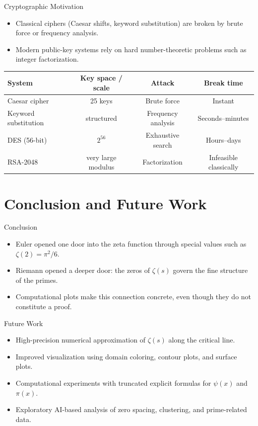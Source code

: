 \documentclass[aspectratio=43]{beamer}
\begin{document}
\begin{frame}{Cryptographic Motivation}
\begin{itemize}
    \item Classical ciphers (Caesar shifts, keyword substitution) are broken by brute force or frequency analysis.
    \item Modern public-key systems rely on hard number-theoretic problems such as integer factorization.
\end{itemize}

\vspace{0.6em}
\centering
\begin{tabular}{lccc}
\toprule
System & Key space / scale & Attack & Break time \\
\midrule
Caesar cipher & 25 keys & Brute force & Instant \\
Keyword substitution & structured & Frequency analysis & Seconds--minutes \\
DES (56-bit) & $2^{56}$ & Exhaustive search & Hours--days \\
RSA-2048 & very large modulus & Factorization & Infeasible classically \\
\bottomrule
\end{tabular}
\end{frame}

\section{Conclusion and Future Work}

\begin{frame}{Conclusion}
\begin{itemize}
    \item Euler opened one door into the zeta function through special values such as $\zeta(2)=\pi^2/6$.
    \item Riemann opened a deeper door: the zeros of $\zeta(s)$ govern the fine structure of the primes.
    \item Computational plots make this connection concrete, even though they do not constitute a proof.
\end{itemize}
\end{frame}

\begin{frame}{Future Work}
\begin{itemize}
    \item High-precision numerical approximation of $\zeta(s)$ along the critical line.
    \item Improved visualization using domain coloring, contour plots, and surface plots.
    \item Computational experiments with truncated explicit formulas for $\psi(x)$ and $\pi(x)$.
    \item Exploratory AI-based analysis of zero spacing, clustering, and prime-related data.
\end{itemize}
\end{frame}
\end{document}
